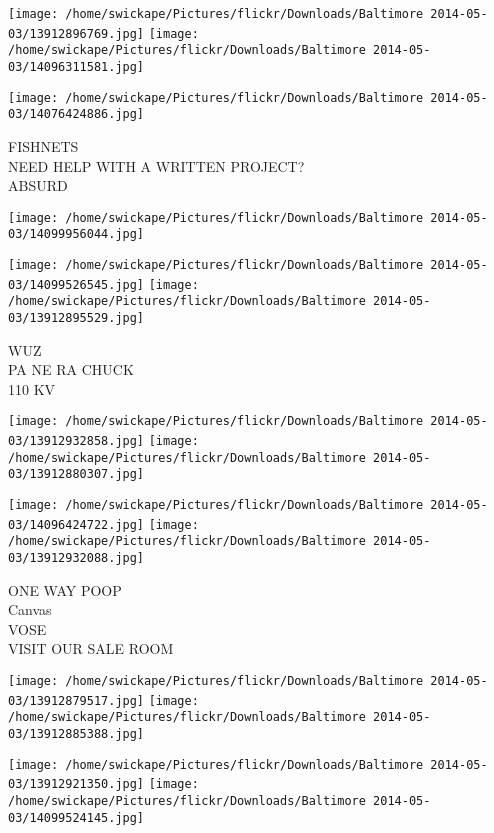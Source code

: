 \documentclass[10pt,letterpaper]{article}
\begin{document}
\texttt{[image: /home/swickape/Pictures/flickr/Downloads/Baltimore 2014-05-03/13912896769.jpg]}
\texttt{[image: /home/swickape/Pictures/flickr/Downloads/Baltimore 2014-05-03/14096311581.jpg]}

\texttt{[image: /home/swickape/Pictures/flickr/Downloads/Baltimore 2014-05-03/14076424886.jpg]}

FISHNETS\\
NEED HELP WITH A WRITTEN PROJECT?\\
ABSURD\\
\pagebreak

\texttt{[image: /home/swickape/Pictures/flickr/Downloads/Baltimore 2014-05-03/14099956044.jpg]}

\vspace{0.25in}
\texttt{[image: /home/swickape/Pictures/flickr/Downloads/Baltimore 2014-05-03/14099526545.jpg]}
\texttt{[image: /home/swickape/Pictures/flickr/Downloads/Baltimore 2014-05-03/13912895529.jpg]}

WUZ\\
PA NE RA CHUCK\\
110 KV\\
\pagebreak

\texttt{[image: /home/swickape/Pictures/flickr/Downloads/Baltimore 2014-05-03/13912932858.jpg]}
\texttt{[image: /home/swickape/Pictures/flickr/Downloads/Baltimore 2014-05-03/13912880307.jpg]}

\texttt{[image: /home/swickape/Pictures/flickr/Downloads/Baltimore 2014-05-03/14096424722.jpg]}
\texttt{[image: /home/swickape/Pictures/flickr/Downloads/Baltimore 2014-05-03/13912932088.jpg]}

ONE WAY POOP\\
Canvas\\
VOSE\\
VISIT OUR SALE ROOM\\
\pagebreak

\texttt{[image: /home/swickape/Pictures/flickr/Downloads/Baltimore 2014-05-03/13912879517.jpg]}
\texttt{[image: /home/swickape/Pictures/flickr/Downloads/Baltimore 2014-05-03/13912885388.jpg]}

\texttt{[image: /home/swickape/Pictures/flickr/Downloads/Baltimore 2014-05-03/13912921350.jpg]}
\texttt{[image: /home/swickape/Pictures/flickr/Downloads/Baltimore 2014-05-03/14099524145.jpg]}
\end{document}

